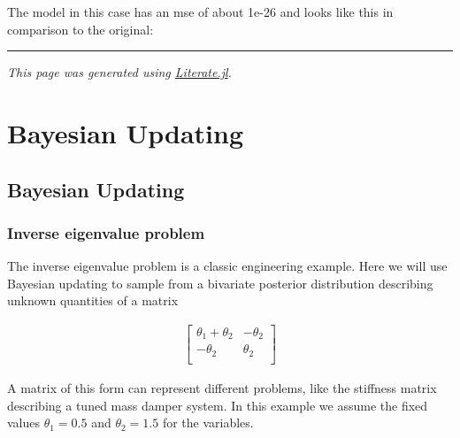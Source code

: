 The model in this case has an mse of about 1e-26 and looks like this in comparison to the original:





\begin{figure}
\centering
\caption{}
\end{figure}




{\rule{\textwidth}{1pt}}


\emph{This page was generated using \href{https://github.com/fredrikekre/Literate.jl}{Literate.jl}.}



\chapter{Bayesian Updating}


\section{Bayesian Updating}



\label{16081037215275166927}{}


\subsection{Inverse eigenvalue problem}



\label{15653452312877879055}{}


The inverse eigenvalue problem is a classic engineering example. Here we will use Bayesian updating to sample from a bivariate posterior distribution describing unknown quantities of a matrix



\begin{equation*}
\begin{split}\begin{bmatrix}
 \theta_1 + \theta_2 & -\theta_2 \\
 -\theta_2 & \theta_2 \\
\end{bmatrix}\end{split}\end{equation*}


A matrix of this form can represent different problems, like the stiffness matrix describing a tuned mass damper system. In this example we assume the fixed values \(\theta_1 = 0.5\) and \(\theta_2 = 1.5\) for the variables.




